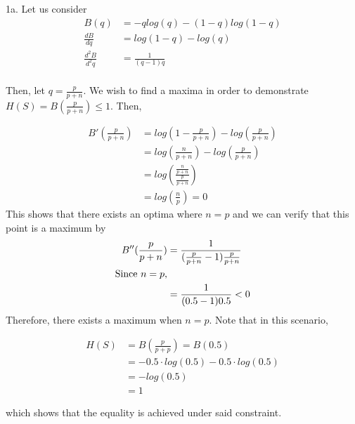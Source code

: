 \documentclass{article}
\begin{document}
1a. 
Let us consider
\begin{align*}
B(q) &= -qlog(q)-(1-q)log(1-q)\\
\frac{dB}{dq} &= log(1-q) - log(q)\\
\frac{d^2B}{d^2q} &= \frac{1}{(q-1)q}\\
\end{align*}

Then, let \(q = \frac{p}{p+n}\). We wish to find a maxima in order to demonstrate \(H(S) = B(\frac{p}{p+n}) \leq 1\). Then, 

\begin{align*}
B'(\frac{p}{p+n})
&= log(1-\frac{p}{p+n}) - log(\frac{p}{p+n})\\
&= log(\frac{n}{p+n}) - log(\frac{p}{p+n})\\
&= log(\frac{\frac{n}{p+n}}{\frac{p}{p+n}})\\
&= log(\frac{n}{p}) = 0
\end{align*}
This shows that there exists an optima where \(n = p\) and we can verify that this point is a maximum by
\begin{align*}
B''(\frac{p}{p+n}) &= \frac{1}{(\frac{p}{p+n}-1)\frac{p}{p+n}}\\
\textnormal{Since \(n = p\),}\\
&= \frac{1}{(0.5-1)0.5} < 0
\end{align*}
Therefore, there exists a maximum when \(n = p\). Note that in this scenario,

\begin{align*}
H(S) 
&= B(\frac{p}{p+p})=B(0.5)\\
&= -0.5\cdot log(0.5)-0.5\cdot log(0.5)\\
&= -log(0.5)\\
&= 1
\end{align*}

which shows that the equality is achieved under said constraint.
\end{document}
